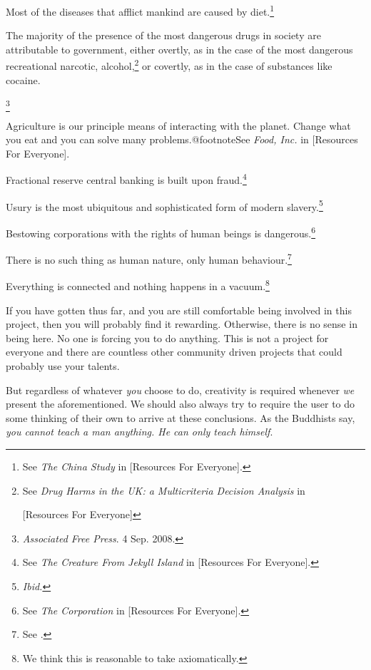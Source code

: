 \item
Most of the diseases that afflict mankind are caused by diet.\footnote{See {\it The China Study} in [Resources For Everyone].}

\item
The majority of the presence of the most dangerous drugs in society are attributable to government, either overtly, as in the case of the most dangerous recreational narcotic, alcohol,\footnote{See {\it Drug Harms in the UK: a Multicriteria Decision Analysis} in 

[Resources For Everyone]} or covertly, as in the case of substances like cocaine.

\footnote{
        {\it Associated Free Press}. 4 Sep. 2008.
        }

\item
Agriculture is our principle means of interacting with the planet. Change what you eat and you can solve many problems.@footnote{See {\it Food, Inc.} in [Resources For Everyone].}

\item
Fractional reserve central banking is built upon fraud.\footnote{See {\it The Creature From Jekyll Island} in [Resources For Everyone].}

\item
Usury is the most ubiquitous and sophisticated form of modern slavery.\footnote{{\it Ibid.}}

\item
Bestowing corporations with the rights of human beings is dangerous.\footnote{See {\it The Corporation} in [Resources For Everyone].}

\item
There is no such thing as human nature, only human behaviour.\footnote{See .}

\item
Everything is connected and nothing happens in a vacuum.\footnote{We think this is reasonable to take axiomatically.}
\stopitemize

If you have gotten thus far, and you are still comfortable being involved in this project, then you will probably find it rewarding. Otherwise, there is no sense in being here. No one is forcing you to do anything. This is not a project for everyone and there are countless other community driven projects that could probably use your talents.

But regardless of whatever {\it you} choose to do, creativity is required whenever {\it we} present the aforementioned. We should also always try to require the user to do some thinking of their own to arrive at these conclusions. As the Buddhists say, {\it you cannot teach a man anything. He can only teach himself}.

